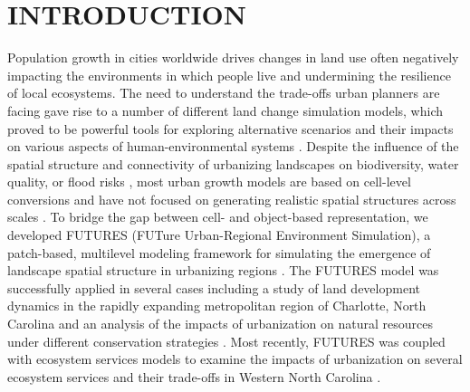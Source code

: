 \documentclass{isprs}
\begin{document}

\maketitle

\section{INTRODUCTION}\label{INTRODUCTION}

Population growth in cities worldwide drives changes in land use
often negatively impacting the environments in which people live and undermining
the resilience of local ecosystems.
The need to understand the trade-offs urban planners are facing
gave rise to a number of different land change simulation models,
which proved to be powerful tools for exploring
alternative scenarios and their impacts on various aspects of human-environmental systems
\cite{chaudhuri2013sleuth,verburg2002modeling,sohl2007fore,waddell2002urbansim}.
Despite the influence of the spatial structure and connectivity 
of urbanizing landscapes on
biodiversity, water quality, or flood risks \cite{alberti2005effects},
most urban growth models are based on cell-level conversions and 
have not focused on generating realistic spatial structures across scales \cite{jantz2005analysis}.
To bridge the gap between cell- and object-based representation, we developed
FUTURES (FUTure Urban-Regional Environment Simulation), a patch-based, multilevel
modeling framework for simulating the emergence of landscape spatial structure
in urbanizing regions \cite{Meentemeyer2012}.
%
The FUTURES model was successfully applied in several cases 
including a study of land development dynamics in the rapidly
expanding metropolitan region of Charlotte, North Carolina \cite{Meentemeyer2012} and an analysis of the impacts
of urbanization on natural resources under different conservation strategies \cite{Dorning2015}.
Most recently, FUTURES was coupled with ecosystem services models to examine the impacts of urbanization on several
ecosystem services and their trade-offs in Western North Carolina \cite{Brian2016}.
\end{document}
